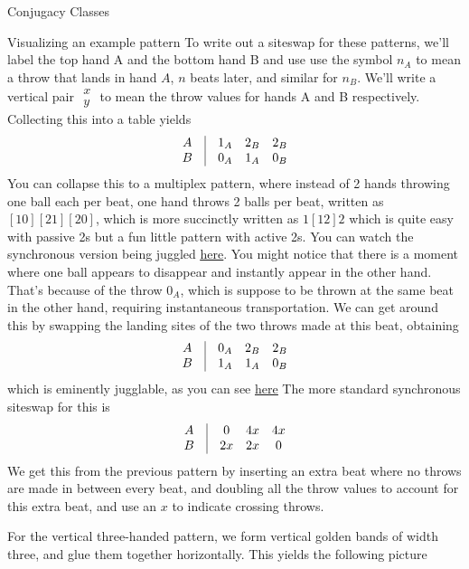 \documentclass[12nt]{article}
\theoremstyle{plain}
\begin{document}
\begin{subsection}{Conjugacy Classes}
\begin{subsection}{Visualizing an example pattern}
To write out a siteswap for these patterns, we'll label the top hand A and the bottom hand B and use use the symbol $n_A$ to mean a throw that lands in hand $A$, $n$ beats later, and similar for $n_B$. We'll write a vertical pair $\begin{array}{c} x \\ y \end{array}$ to mean the throw values for hands A and B respectively. Collecting this into a table yields
\[
\begin{array}{c c c c c }
A &\vline&  1_A & 2_B & 2_B \\
B &\vline&  0_A & 1_A & 0_B
\end{array}
\]
You can collapse this to a multiplex pattern, where instead of 2 hands throwing one ball each per beat, one hand throws 2 balls per beat, written as $[10][21][20]$, which is more succinctly written as $1[12]2$ which is quite easy with passive 2s but a fun little pattern with active 2s. You can watch the synchronous version being juggled \underline{\textcolor{blue}{\href{https://jugglingedge.com/help/siteswapanimator.php?Pattern=(2\%2C0x)(4x\%2C2x)(4x\%2C0)}{here}}}. You might notice that there is a moment where one ball appears to disappear and instantly appear in the other hand. That's because of the throw $0_A$, which is suppose to be thrown at the same beat in the other hand, requiring instantaneous transportation. We can get around this by swapping the landing sites of the two throws made at this beat, obtaining 
\[
\begin{array}{c c c c c }
A &\vline&  0_A & 2_B & 2_B \\
B &\vline&  1_A & 1_A & 0_B
\end{array}
\]
which is eminently jugglable, as you can see \underline{\textcolor{blue}{\href{https://jugglingedge.com/help/siteswapanimator.php?Pattern=(0\%2C2x)(4x\%2C2x)(4x\%2C0)}{here}}}
The more standard synchronous siteswap for this is 
\[
\begin{array}{c c c c c }
A &\vline&  0 & 4x & 4x \\
B &\vline&  2x & 2x & 0
\end{array}
\]
We get this from the previous pattern by inserting an extra beat where no throws are made in between every beat, and doubling all the throw values to account for this extra beat, and use an $x$ to indicate crossing throws.
 
\newpage 
For the vertical three-handed pattern, we form vertical golden bands of width three, and glue them together horizontally. This yields the following picture


\end{subsection}
\end{subsection}
\end{document}
